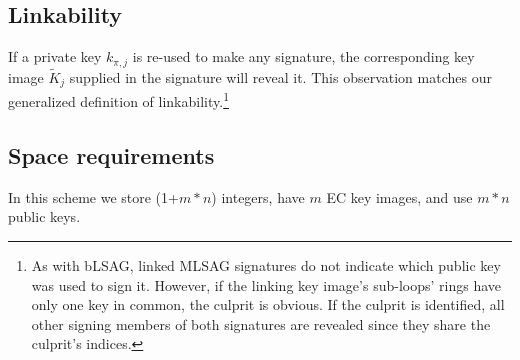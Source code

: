 \subsection*{Linkability}

If a private key \(k_{\pi, j}\) is re-used to make any signature, the corresponding key image \(\tilde{K}_j\) supplied in the signature will reveal it. This observation matches our generalized definition of linkability.\footnote{As with bLSAG, linked MLSAG signatures do not indicate which public key was used to sign it. However, if the linking key image's sub-loops' rings have only one key in common, the culprit is obvious. If the culprit is identified, all other signing members of both signatures are revealed since they share the culprit's indices.}


\subsection*{Space requirements}

In this scheme we store (1+$m*n$) integers, have $m$ EC key images, and use $m*n$ public keys.